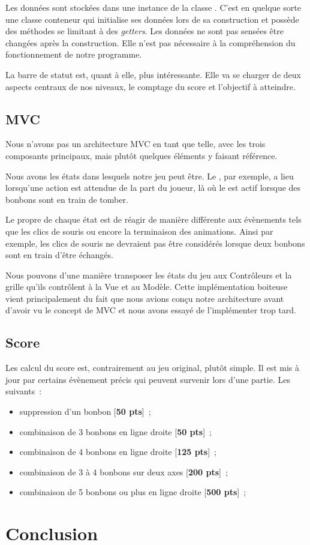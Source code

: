 \documentclass[11pt,a4paper]{article}
\begin{document}
Les données sont stockées dans une instance de la classe
\verb@LevelData@. C'est en quelque sorte une classe
conteneur qui initialise ses données lors de sa construction
et possède des méthodes se limitant à des \emph{getters}.
Les données ne sont pas sensées être changées après la
construction. Elle n'est pas nécessaire à la compréhension
du fonctionnement de notre programme.

La barre de statut est, quant à elle, plus intéressante.
Elle va se charger de deux aspects centraux de nos niveaux, le
comptage du score et l'objectif à atteindre.


\subsection{MVC}

Nous n'avons pas un architecture MVC en tant que telle, avec
les trois composants principaux, mais plutôt quelques éléments y
faisant référence.

Nous avons les états dans lesquels notre jeu
peut être. Le \verb@ReadyState@, par exemple, a
lieu lorsqu'une action est attendue de la part du joueur, là
où le \verb@FallState@ est actif lorsque des bonbons sont
en train de tomber.

Le propre de chaque état est de réagir de manière différente
aux évènements tels que les clics de souris ou encore la
terminaison des animations. Ainsi par exemple, les clics de souris ne devraient
pas être considérés lorsque deux bonbons sont en train
d'être échangés.

Nous pouvons d'une manière transposer les états du jeu aux Contrôleurs et la
grille qu'ils contrôlent à la Vue et au Modèle.
Cette implémentation boiteuse vient principalement du fait
que nous avions conçu notre architecture avant d'avoir vu le
concept de MVC et nous avons essayé de l'implémenter trop
tard.

\subsection{Score}

Les calcul du score est, contrairement au jeu original, plutôt simple.
Il est mis à jour par certains évènement précis qui peuvent
survenir lors d'une partie. Les suivants~:

\begin{itemize}
    \item suppression d'un bonbon [\textbf{50 pts}]~;
    \item combinaison de 3 bonbons en ligne droite [\textbf{50 pts}]~;
    \item combinaison de 4 bonbons en ligne droite [\textbf{125 pts}]~;
    \item combinaison de 3 à 4 bonbons sur deux axes [\textbf{200 pts}]~;
    \item combinaison de 5 bonbons ou plus en ligne droite [\textbf{500 pts}]~;
\end{itemize}

\section{Conclusion}
\end{document}
